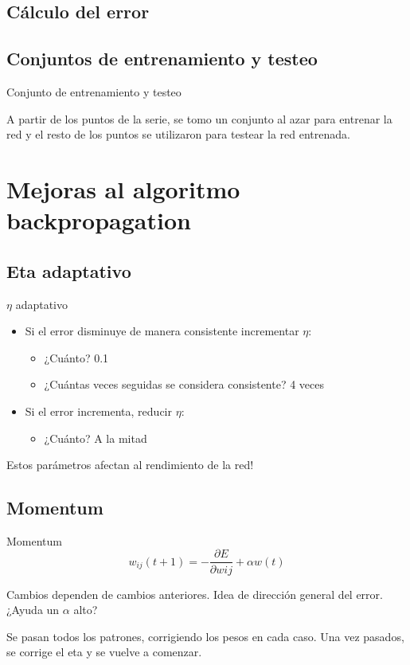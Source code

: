 \documentclass{beamer}
\begin{document}
\subsection{Cálculo del error}

\subsection{Conjuntos de entrenamiento y testeo}
\begin{frame}{Conjunto de entrenamiento y testeo}
\par A partir de los puntos de la serie, se tomo un conjunto al azar para entrenar la red y el resto de los puntos se utilizaron para testear la red entrenada.

\end{frame}

\section{Mejoras al algoritmo backpropagation}

\subsection{Eta adaptativo}
\begin{frame}{$\eta$ adaptativo}
\begin{itemize}
\item Si el error disminuye de manera consistente incrementar $\eta$:
\begin{itemize}
\item ¿Cuánto? 0.1
\item ¿Cuántas veces seguidas se considera consistente? 4 veces

\end{itemize}
\item Si el error incrementa, reducir $\eta$:
\begin{itemize}
\item ¿Cuánto? A la mitad
\end{itemize}
\end{itemize}
\par Estos parámetros afectan al rendimiento de la red!
\end{frame}

\subsection{Momentum}
\begin{frame}{Momentum}
\[w_{ij}(t+1)= - \frac{\partial E}{\partial w{ij}} + \alpha w(t)\]
\par Cambios dependen de cambios anteriores. Idea de dirección general del error. ¿Ayuda un $\alpha$ alto?\\
\par Se pasan todos los patrones, corrigiendo los pesos en cada caso. Una vez pasados, se corrige el eta y se vuelve a comenzar.
\end{frame}
\end{document}
